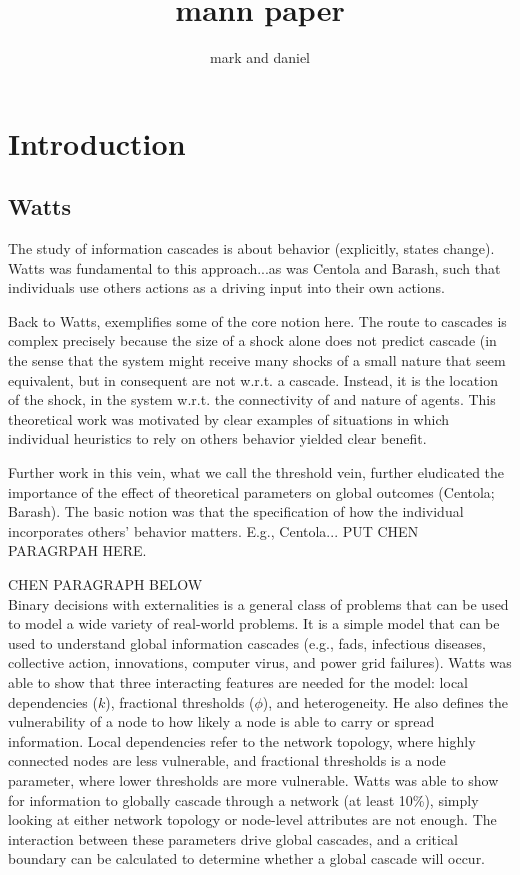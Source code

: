 \documentclass[10pt,letterpaper]{article}
\author{mark and daniel}
\title{mann paper}
\begin{document}
\section{Introduction}

\subsection{Watts}

The study of information cascades is about behavior (explicitly, states change).
Watts was fundamental to this approach...as was Centola and Barash, such that individuals use others actions as a driving input into their own actions.

Back to Watts, exemplifies some of the core notion here.
The route to cascades is complex precisely because the size of a shock alone does not predict cascade (in the sense that the system might receive many shocks of a small nature that seem equivalent, but in consequent are not w.r.t. a cascade.
Instead, it is the location of the shock, in the system w.r.t. the connectivity of and nature of agents. This theoretical work was motivated by clear examples of situations in which individual heuristics to rely on others behavior yielded clear benefit. 

Further work in this vein, what we call the threshold vein, further eludicated the importance of the effect of theoretical parameters on global outcomes (Centola; Barash).  The basic notion was that the specification of how the individual incorporates others' behavior matters.  E.g.,  Centola... PUT CHEN PARAGRPAH HERE.

CHEN PARAGRAPH BELOW\\
Binary decisions with externalities is a general class of problems
that can be used to model a wide variety of real-world problems.
It is a simple model that can be used to understand global information cascades
(e.g., fads, infectious diseases, collective action, innovations, computer virus,
and power grid failures).
Watts was able to show that three interacting features are needed for the model:
local dependencies ($k$), fractional thresholds ($\phi$), and heterogeneity.
He also defines the vulnerability of a node to how likely a node is able to carry or spread information.
Local dependencies refer to the network topology, where highly connected nodes are less vulnerable,
and fractional thresholds is a node parameter, where lower thresholds are more vulnerable.
Watts was able to show for information to globally cascade through a network (at least 10\%),
simply looking at either network topology or node-level attributes are not enough.
The interaction between these parameters drive global cascades,
and a critical boundary can be calculated to determine whether a global cascade will occur.
\end{document}
